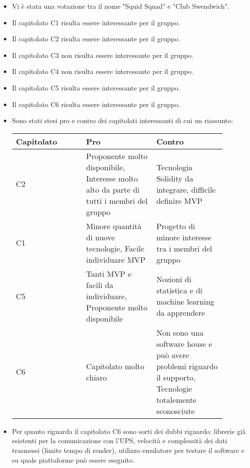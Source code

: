 \begin{itemize}
    \item Vi è stata una votazione tra il nome "Squid Squad" e "Club Swendwich".
    \item Il capitolato C1 risulta essere interessante per il gruppo.
    \item Il capitolato C2 risulta essere interessante per il gruppo.
    \item Il capitolato C3 non risulta essere interessante per il gruppo.
    \item Il capitolato C4 non risulta essere interessante per il gruppo.
    \item Il capitolato C5 risulta essere interessante per il gruppo.
    \item Il capitolato C6 risulta essere interessante per il gruppo.
    \item Sono stati stesi pro e contro dei capitolati interessanti di cui un riassunto: \\
        \begin{tabular}{|p{0.30\linewidth} |p{0.30\linewidth} p{0.30 \linewidth}|}
        \hline
        Capitolato & Pro & Contro                                                                                                                                             \\
        \hline
        C2         & Proponente molto disponibile, Interesse molto alto da parte di tutti i membri del gruppo & Tecnologia Solidity da integrare, difficile definire MVP \\
        \hline
        C1         & Minore quantità di nuove tecnologie, Facile individuare MVP & Progetto di minore interesse tra i membri del gruppo \\
        \hline
        C5         & Tanti MVP e facili da individuare, Proponente molto disponibile & Nozioni di statistica e di machine learning da apprendere \\
        \hline
        C6         & Capitolato molto chiaro & Non sono una software house e può avere problemi riguardo il supporto, Tecnologie totalemente sconosciute \\
        \hline
        \end{tabular}
    \item Per quanto riguarda il capitolato C6 sono sorti dei dubbi riguardo: librerie già esistenti per la comunicazione con l'UPS, velocità e complessità dei dati trasmessi (limite tempo di render), utilizzo emulatore per testare il software e su quale piattaforme può essere eseguito.

\end{itemize}
